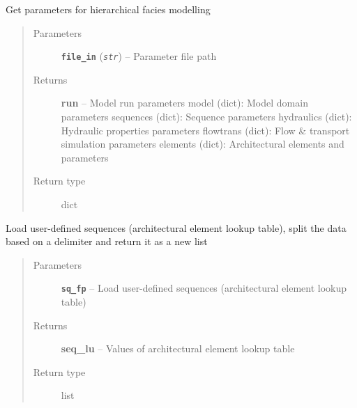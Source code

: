 \documentclass[letterpaper,10pt,english]{sphinxmanual}
\begin{document}

\begin{fulllineitems}
\label{hyvr:hyvr.hyvr.utils.parameters}
Get parameters for hierarchical facies modelling
\begin{quote}\begin{description}
\item[{Parameters}] \leavevmode
\textbf{\texttt{file\_in}} (\emph{\texttt{str}}) -- Parameter file path

\item[{Returns}] \leavevmode
\textbf{run} -- Model run parameters
model (dict):           Model domain parameters
sequences (dict):       Sequence parameters
hydraulics (dict):      Hydraulic properties parameters
flowtrans (dict):       Flow \& transport simulation parameters
elements (dict):        Architectural elements and parameters

\item[{Return type}] \leavevmode
dict

\end{description}\end{quote}

\end{fulllineitems}


\begin{fulllineitems}
\label{hyvr:hyvr.hyvr.utils.read_lu}
Load user-defined sequences (architectural element lookup table),
split the data based on a delimiter and return it as a new list
\begin{quote}\begin{description}
\item[{Parameters}] \leavevmode
\textbf{\texttt{sq\_fp}} -- Load user-defined sequences (architectural element lookup table)

\item[{Returns}] \leavevmode
\textbf{seq\_lu} -- Values of architectural element lookup table

\item[{Return type}] \leavevmode
list

\end{description}\end{quote}

\end{fulllineitems}
\end{document}
